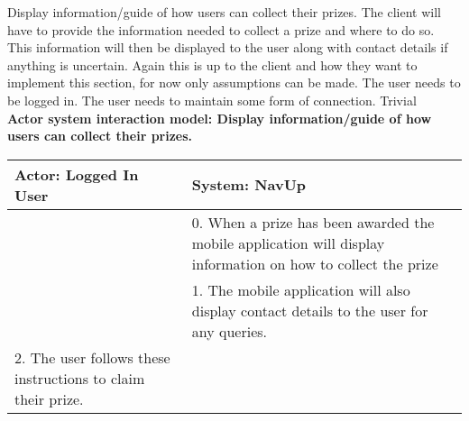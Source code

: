 \FuncReq
{Display information/guide of how users can collect their prizes.}
{The client will have to provide the information needed to collect a prize and where to do so. This information will then be displayed to the user along with contact details if anything is uncertain. Again this is up to the client and how they want to implement this section, for now only assumptions can be made.}
{The user needs to be logged in.
The user needs to maintain some form of connection.}
{Trivial}
\\
\textbf{Actor system interaction model: Display information/guide of how users can collect their prizes.}\\
\begin{tabular}{ | p{6cm} | p{6cm} |}
\hline
Actor: Logged In User & System: NavUp \\ \hline
& 0. When a prize has been awarded the mobile application will display information on how to collect the prize\\ \hline
& 1. The mobile application will also display contact details to the user for any queries.\\ \hline
2. The user follows these instructions to claim their prize. &\\ \hline
\end{tabular}
\\
\bigskip
